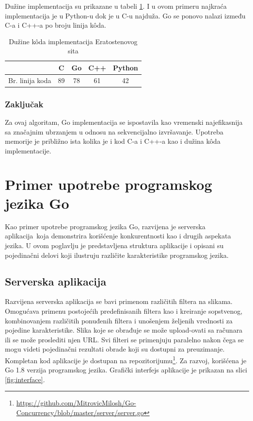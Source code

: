 \documentclass[12pt,oneside]{memoir}
\begin{document}
Dužine implementacija su prikazane u tabeli \ref{tab:prime2}. I u ovom primeru najkraća implementacija je u Python-u dok je u C-u najduža. Go se ponovo nalazi između C-a i C++-a po broju linija k\^{o}da.

\begin{table}
\begin{center}
\caption{Dužine k\^{o}da implementacija Eratostenovog sita}
\begin{tabular}{|c|c|c|c|c|}
\hline
		&  C  		&Go 	& C++ & Python 	 \\ \hline
Br. linija koda& 89		& 78	&61	&42		 \\ \hline
\end{tabular}
\label{tab:prime2}
\end{center}
\end{table}


\subsection{Zaključak}

Za ovaj algoritam, Go implementacija se ispostavila kao vremenski najefikasnija sa značajnim ubrzanjem u odnosu na sekvencijalno izvršavanje. Upotreba memorije je približno ista kolika je i kod C-a i C++-a kao i dužina k\^{o}da implementacije.



\chapter{Primer upotrebe programskog jezika Go}

Kao primer upotrebe programskog jezika Go, razvijena je serverska aplikacija\ koja demonstrira korišćenje konkurentnosti kao i drugih aspekata jezika. U ovom poglavlju je predstavljena struktura aplikacije i opisani su pojedinačni delovi koji ilustruju različite karakteristike programskog jezika. 

\section{Serverska aplikacija}

Razvijena serverska aplikacija se bavi primenom različitih filtera na slikama. Omogućava primenu postojećih predefinisanih filtera kao i kreiranje sopstvenog, kombinovanjem različitih ponuđenih filtera i unošenjem željenih vrednosti za pojedine karakteristike. Slika koje se obrađuje se može upload-ovati sa računara ili se može proslediti njen URL. Svi filteri se primenjuju paralelno nakon čega se mogu videti pojedinačni rezultati obrade koji su dostupni za preuzimanje. Kompletan kod aplikacije je dostupan na repozitorijumu\footnote{\url{https://github.com/MitrovicMilosh/Go-Concurrency/blob/master/server/server.go}}. Za razvoj, korišćena je Go 1.8 verzija programskog jezika. Grafički interfejs aplikacije je prikazan na slici \ref{fig:interface}.
\end{document}
